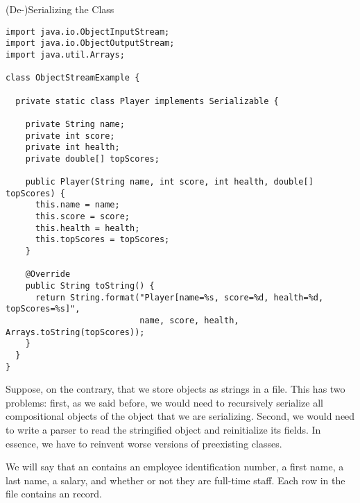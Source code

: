 \begin{cl}{(De-)Serializing the  Class}
\begin{lstlisting}[language=MyJava]
import java.io.ObjectInputStream;
import java.io.ObjectOutputStream;
import java.util.Arrays;

class ObjectStreamExample {

  private static class Player implements Serializable {

    private String name;
    private int score;
    private int health;
    private double[] topScores;
    
    public Player(String name, int score, int health, double[] topScores) {
      this.name = name;
      this.score = score;
      this.health = health;
      this.topScores = topScores;
    }
    
    @Override
    public String toString() {
      return String.format("Player[name=%s, score=%d, health=%d, topScores=%s]", 
                           name, score, health, Arrays.toString(topScores));
    }
  }
}
\end{lstlisting}
\end{cl}

Suppose, on the contrary, that we store objects as strings in a file. This has two problems: first, as we said before, we would need to recursively serialize all compositional objects of the object that we are serializing. Second, we would need to write a parser to read the stringified object and reinitialize its fields. In essence, we have to reinvent worse versions of preexisting classes.


We will say that an  contains an employee identification number, a first name, a last name, a salary, and whether or not they are full-time staff. Each row in the file contains an  record.

